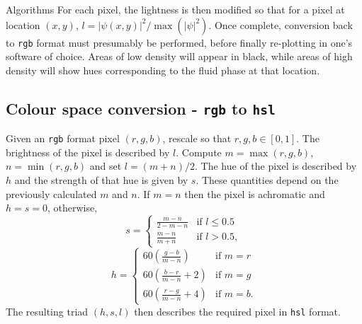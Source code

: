 \begin{chapter}{\label{app:algorithms}Algorithms}
For each pixel, the lightness is then modified so that for a pixel at location $(x,y)$, $l = |\psi(x,y)|^2/\max(|\psi|^2)$. Once complete, conversion back to {\tt rgb} format must presumably be performed, before finally re-plotting in one's software of choice. Areas of low density will appear in black, while areas of high density will show hues corresponding to the fluid phase at that location.

\subsection{Colour space conversion - {\tt rgb} to {\tt hsl}}
Given an {\tt rgb} format pixel $(r,g,b)$, rescale so that $r,g,b \in [0,1]$. The brightness of the pixel is described by $l$. Compute $m = \max(r,g,b)$, $n = \min(r,g,b)$ and set $l = (m+n)/2$. The hue of the pixel is described by $h$ and the strength of that hue is given by $s$. These quantities depend on the previously calculated $m$ and $n$. If $m=n$ then the pixel is achromatic and $h=s=0$, otherwise,
\begin{equation}
s =
    \begin{cases}
      \frac{m-n}{2 - m - n} &\mbox{if } l \leq 0.5 \\
      \frac{m-n}{m+n} &\mbox{if } l > 0.5,
    \end{cases}
\end{equation}
\begin{equation}
h =
    \begin{cases}
      60(\frac{g-b}{m-n}) &\mbox{if } m=r \\
      60(\frac{b-r}{m-n}+2) &\mbox{if } m=g \\
      60(\frac{r-g}{m-n}+4) &\mbox{if } m=b.
    \end{cases}
\end{equation}
The resulting triad $(h,s,l)$ then describes the required pixel in {\tt hsl} format.


\end{chapter}
